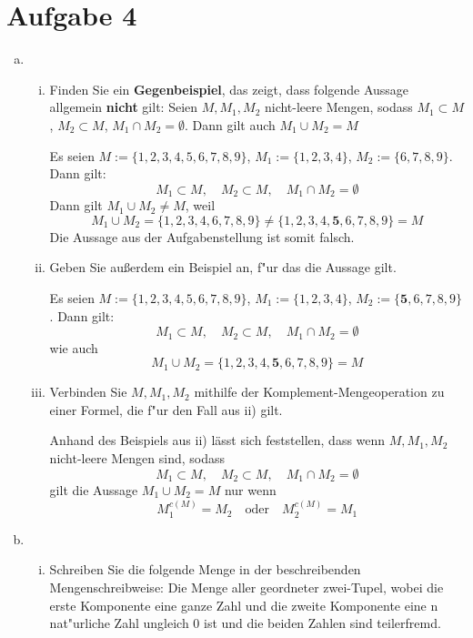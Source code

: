 \section{Aufgabe 4}
\setcounter{section}{4}

\begin{enumerate}[(a)]
    \item \begin{enumerate}[i)]
            \item Finden Sie ein \textbf{Gegenbeispiel}, das zeigt, dass
                folgende Aussage allgemein \textbf{nicht} gilt: Seien
                $M,M_1,M_2$ nicht-leere Mengen, sodass $M_1 \subset M$,
                $M_2 \subset M$, $M_1 \cap M_2 = \emptyset$. Dann gilt auch
                $M_1 \cup M_2 = M$

                Es seien $M := \{ 1, 2, 3, 4, 5, 6, 7, 8, 9 \}$, $M_1 := \{1,
                2, 3, 4\}$, $M_2 := \{6, 7, 8, 9\}$. Dann gilt:
                $$M_1 \subset M, \quad M_2 \subset M, \quad M_1 \cap M_2 = \emptyset$$
                Dann gilt $M_1 \cup M_2 \neq M$, weil
                $$M_1 \cup M_2 = \{ 1, 2, 3, 4, 6, 7, 8, 9 \} \neq \{1, 2, 3, 4, \textbf{5}, 6, 7, 8, 9\} = M $$
                Die Aussage aus der Aufgabenstellung ist somit falsch.

            \item Geben Sie au{\ss}erdem ein Beispiel an, f"ur das die Aussage gilt.

                Es seien $M := \{ 1, 2, 3, 4, 5, 6, 7, 8, 9 \}$, $M_1 := \{1,
                2, 3, 4\}$, $M_2 := \{\textbf{5}, 6, 7, 8, 9\}$. Dann gilt:
                $$M_1 \subset M, \quad M_2 \subset M, \quad M_1 \cap M_2 = \emptyset$$
                wie auch
                $$M_1 \cup M_2 = \{1, 2, 3, 4, \textbf{5}, 6, 7, 8, 9\} = M$$

            \item Verbinden Sie $M, M_1, M_2$ mithilfe der
                Komplement-Mengeoperation zu einer Formel, die f"ur den Fall
                aus ii) gilt.

                Anhand des Beispiels aus ii) lässt sich feststellen, dass wenn
                $M,M_1,M_2$ nicht-leere Mengen sind, sodass $$M_1 \subset M,
                \quad M_2 \subset M, \quad M_1 \cap M_2 = \emptyset$$ gilt die
                Aussage $M_1 \cup M_2 = M$ nur wenn $$M_1^{c(M)} = M_2
                \quad\text{oder}\quad M_2^{c(M)} = M_1$$
        \end{enumerate}
    \item \begin{enumerate}[i)]
            \item  Schreiben Sie die folgende Menge in der beschreibenden Mengenschreibweise:
                Die Menge aller geordneter zwei-Tupel, wobei die erste
                Komponente eine ganze Zahl und die zweite Komponente eine n
                nat"urliche Zahl ungleich 0 ist und die beiden Zahlen sind
                teilerfremd.


\end{enumerate}
\end{enumerate}
